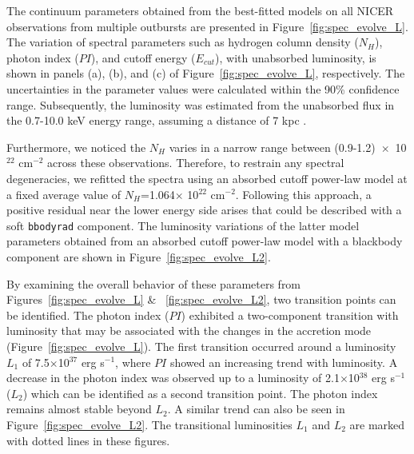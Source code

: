 \documentclass[twocolumn,trackchanges]{aastex631}
\begin{document}
The continuum parameters obtained from the best-fitted models on all NICER observations from multiple outbursts are presented in Figure~\ref{fig:spec_evolve_L}.
The variation of spectral parameters such as hydrogen column density ($N_{H}$), photon index ($PI$), and cutoff energy ($E_{cut}$), with unabsorbed luminosity, is shown in panels (a), (b), and (c) of Figure~\ref{fig:spec_evolve_L}, respectively. The uncertainties in the parameter values were calculated within the 90\% confidence range. Subsequently, the luminosity was estimated from the unabsorbed flux in the 0.7-10.0 keV energy range, assuming a distance of 7 kpc \citep{2018ApJ...863....9W}.

 
Furthermore, we noticed the $N_{H}$ varies in a narrow range between (0.9-1.2)~$\times$~10$^{22}$ cm$^{-2}$ across these observations. Therefore, to restrain any spectral degeneracies, we refitted the spectra using an absorbed cutoff power-law model at a fixed average value of $N_{H}$=1.064$\times$ 10$^{22}$ cm$^{-2}$. Following this approach, a positive residual near the lower energy side arises that could be described with a soft \texttt{bbodyrad} component. The luminosity variations of the latter model parameters obtained from an absorbed cutoff power-law model with a blackbody component are shown in Figure~\ref{fig:spec_evolve_L2}.




By examining the overall behavior of these parameters from  Figures~\ref{fig:spec_evolve_L} \& ~\ref{fig:spec_evolve_L2}, two transition points can be identified. The photon index ($PI$) exhibited a  two-component transition with luminosity that may be associated with the changes in the accretion mode (Figure~\ref{fig:spec_evolve_L}). The first transition occurred around a luminosity $L_{1}$ of  7.5$\times$10$^{37}$ erg s$^{-1}$, where $PI$ showed an increasing trend with luminosity. A decrease in the photon index was observed up to a luminosity of 2.1$\times$10$^{38}$ erg s$^{-1}$ ($L_{2}$) which can be identified as a second transition point. The photon index remains almost stable beyond $L_{2}$.  A similar trend can also be seen in Figure~\ref{fig:spec_evolve_L2}. The transitional luminosities $L_{1}$ and $L_{2}$ are marked with dotted lines in these figures.   
\end{document}
